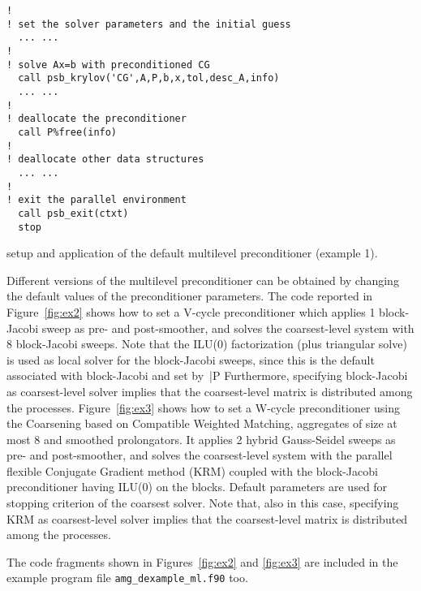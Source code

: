 \begin{listing}[tbp]
\begin{center}
\begin{minipage}{.90\textwidth}
{\begin{verbatim}
!
! set the solver parameters and the initial guess
  ... ...
!
! solve Ax=b with preconditioned CG
  call psb_krylov('CG',A,P,b,x,tol,desc_A,info)
  ... ...
!
! deallocate the preconditioner
  call P%free(info)
!
! deallocate other data structures
  ... ...
!
! exit the parallel environment
  call psb_exit(ctxt)
  stop
\end{verbatim}
}
\fi
\end{minipage}
\caption{setup and application of the default multilevel preconditioner (example 1).
\label{fig:ex1}}
\end{center}
\end{listing}

Different versions of the multilevel preconditioner can be obtained by changing
the default values of the preconditioner parameters. The code reported in
Figure~\ref{fig:ex2} shows how to set a V-cycle preconditioner
which applies 1 block-Jacobi sweep as pre- and post-smoother,
and solves the coarsest-level system with 8 block-Jacobi sweeps.
Note that the ILU(0) factorization (plus triangular solve) is used as
local solver for the block-Jacobi sweeps, since this is the default associated
with block-Jacobi and set by~\fortinline|P%
Furthermore, specifying block-Jacobi as coarsest-level
solver implies that the coarsest-level matrix is distributed
among the processes.
Figure~\ref{fig:ex3} shows how to set a W-cycle preconditioner using the Coarsening based on Compatible Weighted Matching, aggregates of size at most $8$ and smoothed prolongators. It applies
2 hybrid Gauss-Seidel sweeps as pre- and post-smoother,
and solves the coarsest-level system with the parallel flexible Conjugate Gradient method (KRM) coupled with the block-Jacobi preconditioner having ILU(0) on the blocks. Default parameters are used for stopping criterion of the coarsest solver.
Note that, also in this case, specifying KRM as coarsest-level
solver implies that the coarsest-level matrix is distributed
among the processes.



The code fragments shown in Figures~\ref{fig:ex2} and \ref{fig:ex3} are
included in the example program file \verb|amg_dexample_ml.f90| too.

